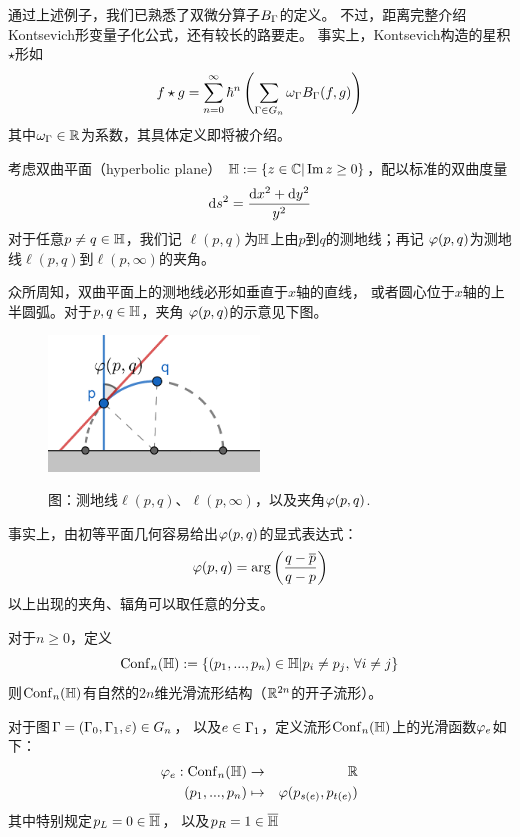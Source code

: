 通过上述例子，我们已熟悉了双微分算子$B_{\Gamma}$的定义。
不过，距离完整介绍Kontsevich形变量子化公式，还有较长的路要走。
事实上，Kontsevich构造的星积$\star$形如
$$
  f\star g
=
  \sum_{n=0}^{\infty}
    \hbar^n
    \left(
      \sum_{\Gamma\in G_n}
        \omega_{\Gamma}
        B_\Gamma(f,g)
    \right)
$$
其中$\omega_\Gamma\in\mathbb{R}$为系数，其具体定义即将被介绍。


\begin{notation}
考虑双曲平面（hyperbolic plane）
$\mathbb{H}:=\{z\in\mathbb{C}|\operatorname{Im} z\geq 0\}$，配以标准的双曲度量
$$\mathrm{d} s^2=\frac{\mathrm{d} x^2+\mathrm{d} y^2}{y^2}$$
对于任意$p\neq q\in\mathbb{H}$，我们记
$\ell(p,q)$为$\mathbb{H}$上由$p$到$q$的测地线；再记
$\varphi(p,q)$为测地线$\ell(p,q)$到$\ell(p,\infty)$的夹角。
\end{notation}

众所周知，双曲平面上的测地线必形如垂直于$x$轴的直线，
或者圆心位于$x$轴的上半圆弧。对于$p,q\in\mathbb{H}$，夹角
$\varphi(p,q)$的示意见下图。

\begin{figure}[ht]
\centering
\includegraphics[width=0.5\textwidth]
  {figures/hyperbolic.png}

图：测地线$\ell(p,q)$、$\ell(p,\infty)$，以及夹角$\varphi(p,q)$.
\end{figure}

事实上，由初等平面几何容易给出$\varphi(p,q)$的显式表达式：
$$\varphi(p,q)=\arg\left(\frac{q-\overline{p}}{q-p}\right)$$
以上出现的夹角、辐角可以取任意的分支。

\begin{notation}%
对于$n\geq 0$，定义
$$\operatorname{Conf}_n(\mathbb{H}):=\{(p_1,...,p_n)\in\mathbb{H}|
p_i\neq p_j,\,\forall i\neq j\}$$
则$\operatorname{Conf}_n(\mathbb{H})$有自然的$2n$维光滑流形结构（$\mathbb{R}^{2n}$的开子流形）。

对于图$\Gamma=(\Gamma_0,\Gamma_1,\varepsilon)\in G_n$，
以及$e\in\Gamma_1$，定义流形$\operatorname{Conf}_n(\mathbb{H})$上的光滑函数$\varphi_e$如下：
\begin{eqnarray*}
\varphi_e:\operatorname{Conf}_n(\mathbb{H})&\to&\mathbb{R}\\
(p_1,...,p_n)&\mapsto&\varphi(p_{s(e)},p_{t(e)})
\end{eqnarray*}
其中特别规定$p_L=0\in\overline{\mathbb{H}}$，
以及$p_R=1\in\overline{\mathbb{H}}$
\end{notation}


